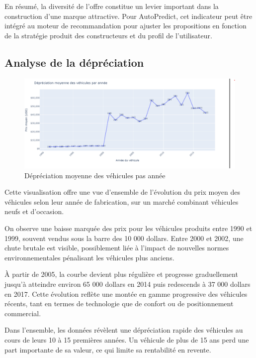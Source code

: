 \documentclass[12pt]{report}
\begin{document}
En résumé, la diversité de l’offre constitue un levier important dans la construction d’une marque attractive. Pour AutoPredict, cet indicateur peut être intégré au moteur de recommandation pour ajuster les propositions en fonction de la stratégie produit des constructeurs et du profil de l’utilisateur.


\subsection{Analyse de la dépréciation}

\begin{figure}[H]
    \centering
    \includegraphics[width=1\textwidth]{Annee_prix.png}
    \caption{Dépréciation moyenne des véhicules pas année}
    \label{fig:annee-prix}
\end{figure}

Cette visualisation offre une vue d’ensemble de l’évolution du prix moyen des véhicules selon leur année de fabrication, sur un marché combinant véhicules neufs et d’occasion.

On observe une baisse marquée des prix pour les véhicules produits entre 1990 et 1999, souvent vendus sous la barre des 10 000 dollars. Entre 2000 et 2002, une chute brutale est visible, possiblement liée à l’impact de nouvelles normes environnementales pénalisant les véhicules plus anciens.

À partir de 2005, la courbe devient plus régulière et progresse graduellement jusqu’à atteindre environ 65 000 dollars en 2014 puis redescends à 37 000 dollars en 2017. Cette évolution reflète une montée en gamme progressive des véhicules récents, tant en termes de technologie que de confort ou de positionnement commercial.

Dans l’ensemble, les données révèlent une dépréciation rapide des véhicules au cours de leurs 10 à 15 premières années. Un véhicule de plus de 15 ans perd une part importante de sa valeur, ce qui limite sa rentabilité en revente.
\end{document}
